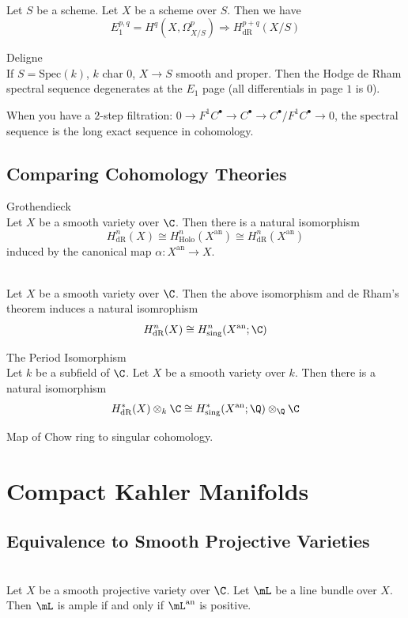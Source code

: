 \documentclass[a4paper]{article}
\begin{document}
\begin{lmm}{}{}\\
Let $S$ be a scheme. Let $X$ be a scheme over $S$. Then we have $$E_1^{p,q}=H^q(X,\Omega_{X/S}^p)\Rightarrow H_\text{dR}^{p+q}(X/S)$$
\end{lmm}

\begin{thm}{Deligne}{}\\
If $S=\text{Spec}(k)$, $k$ char $0$, $X\to S$ smooth and proper. Then the Hodge de Rham spectral sequence degenerates at the $E_1$ page (all differentials in page $1$ is $0$). 
\end{thm}

When you have a $2$-step filtration: $0\to F^1C^\bullet\to C^\bullet\to C^\bullet/F^1C^\bullet\to 0$, the spectral sequence is the long exact sequence in cohomology. 

\subsection{Comparing Cohomology Theories}
\begin{thm}{Grothendieck}{}\\
Let $X$ be a smooth variety over $\C$. Then there is a natural isomorphism $$H_\text{dR}^n(X)\cong H_\text{Holo}^n(X^\text{an})\cong H_\text{dR}^n(X^\text{an})$$ induced by the canonical map $\alpha:X^\text{an}\to X$. 
\end{thm}

\begin{crl}{}{}\\
Let $X$ be a smooth variety over $\C$. Then the above isomorphism and de Rham's theorem induces a natural isomrophism $$H_\text{dR}^n(X)\cong H_\text{sing}^n(X^\text{an};\C)$$
\end{crl}

\begin{thm}{The Period Isomorphism}{}\\
Let $k$ be a subfield of $\C$. Let $X$ be a smooth variety over $k$. Then there is a natural isomorphism $$H_\text{dR}^\ast(X)\otimes_k\C\cong H_\text{sing}^\ast(X^\text{an};\Q)\otimes_\Q\C$$
\end{thm}

Map of Chow ring to singular cohomology. 

\pagebreak
\section{Compact Kahler Manifolds}
\subsection{Equivalence to Smooth Projective Varieties}
\begin{prp}{}{}\\
Let $X$ be a smooth projective variety over $\C$. Let $\mL$ be a line bundle over $X$. Then $\mL$ is ample if and only if $\mL^\text{an}$ is positive. 
\end{prp}
\end{document}
